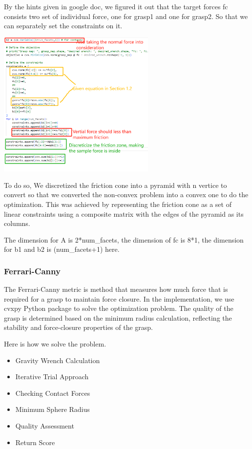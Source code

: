 \documentclass{article}
\begin{document}
\begin{multicols}{2}
By the hints given in google doc, we figured it out that the target forces fc consists two set of individual force, one for grasp1 and one for grasp2. So that we can separately set the constraints on it. 

\begin{minipage}{\linewidth}
\centering
\includegraphics[width=7.8cm]{contactForceExist.png}
\label{contactForceExist Constraint Configuration}
\end{minipage}

To do so, We discretized the friction cone into a pyramid with n vertice to convert so that we converted the non-convex problem into a convex one to do the optimization. This was achieved by representing the friction cone as a set of linear constraints using a composite matrix with the edges of the pyramid as its columns. 

The dimension for A is 2*num\_facets, the dimension of fc is 8*1, the dimension for b1 and b2 is (num\_facets+1) here.



\subsubsection{Ferrari-Canny}

The Ferrari-Canny metric is method that measures how much force that is required for a grasp to maintain force closure. In the implementation, we use cvxpy Python package to solve the optimization problem. The quality of the grasp is determined based on the minimum radius calculation, reflecting the stability and force-closure properties of the grasp.\cite{RUBERT2019103274}

Here is how we solve the problem.


\begin{itemize}
    \item Gravity Wrench Calculation
    \item Iterative Trial Approach
    \item Checking Contact Forces
    \item Minimum Sphere Radius\cite{219918}
    \item Quality Assessment
    \item Return Score
    

\end{itemize}
\end{multicols}
\end{document}
